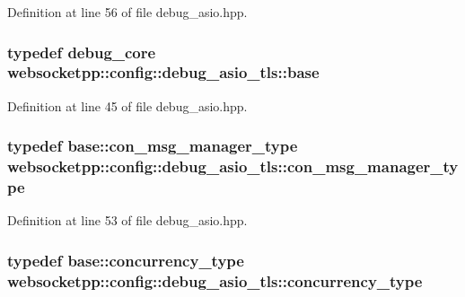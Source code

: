 Definition at line 56 of file debug\+\_\+asio.\+hpp.

\hypertarget{structwebsocketpp_1_1config_1_1debug__asio__tls_acb62b8218a7ef96b4a879a06abcd3ebc}{}
\subsubsection[{base}]{\setlength{\rightskip}{0pt plus 5cm}typedef {\bf debug\+\_\+core} {\bf websocketpp\+::config\+::debug\+\_\+asio\+\_\+tls\+::base}}\label{structwebsocketpp_1_1config_1_1debug__asio__tls_acb62b8218a7ef96b4a879a06abcd3ebc}


Definition at line 45 of file debug\+\_\+asio.\+hpp.

\hypertarget{structwebsocketpp_1_1config_1_1debug__asio__tls_a6ccadcf2290d1c3cb58a5da5e51517e1}{}
\subsubsection[{con\+\_\+msg\+\_\+manager\+\_\+type}]{\setlength{\rightskip}{0pt plus 5cm}typedef {\bf base\+::con\+\_\+msg\+\_\+manager\+\_\+type} {\bf websocketpp\+::config\+::debug\+\_\+asio\+\_\+tls\+::con\+\_\+msg\+\_\+manager\+\_\+type}}\label{structwebsocketpp_1_1config_1_1debug__asio__tls_a6ccadcf2290d1c3cb58a5da5e51517e1}


Definition at line 53 of file debug\+\_\+asio.\+hpp.

\hypertarget{structwebsocketpp_1_1config_1_1debug__asio__tls_a22690e0b288bab2b1c14abcf6b3f445c}{}
\subsubsection[{concurrency\+\_\+type}]{\setlength{\rightskip}{0pt plus 5cm}typedef {\bf base\+::concurrency\+\_\+type} {\bf websocketpp\+::config\+::debug\+\_\+asio\+\_\+tls\+::concurrency\+\_\+type}}\label{structwebsocketpp_1_1config_1_1debug__asio__tls_a22690e0b288bab2b1c14abcf6b3f445c}


